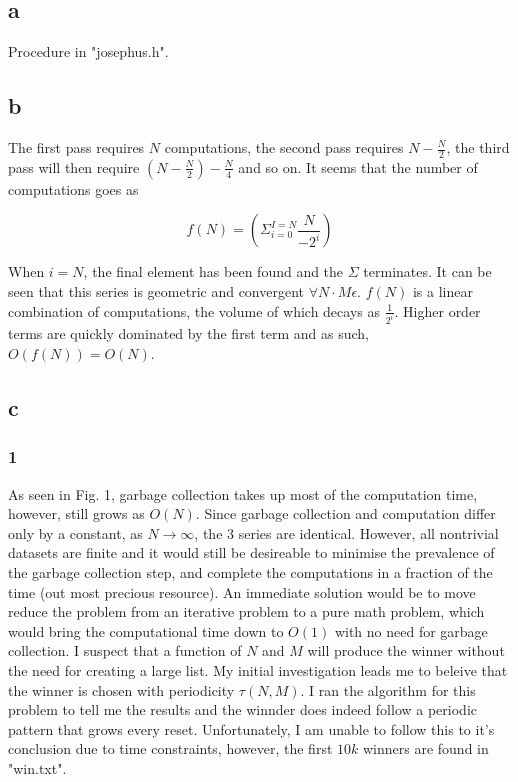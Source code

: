 \documentclass[journal]{IEEEtran}
\begin{document}
\subsection*{a}
Procedure in "josephus.h".

\subsection*{b}

The first pass requires $N$ computations, the second pass requires $N - \frac{N}{2}$, the third pass will then require
$(N - \frac{N}{2}) - \frac{N}{4}$ and so on. It seems that the number of computations goes as 

$$f(N) = (\Sigma_{i=0}^{I = N} \frac{N}{-2^i})$$

When $i = N$, the final element has been found and the $\Sigma$ terminates. It can be seen that this series is geometric 
and convergent $\forall N \cdot M \epsilon $. $f(N)$ is a linear combination of computations, the volume of which decays as 
$\frac{1}{2^i}$. Higher order terms are quickly dominated by the first term and as such, 
$O(f(N)) = \boxed{O(N)}$. 


\subsection*{c}

\subsubsection{1}

As seen in Fig. 1, garbage collection takes up most of the computation time, however, still grows as $O(N)$. Since 
garbage collection and computation differ only by a constant, as $N \rightarrow \infty$, the 3 series are identical.
However, all nontrivial datasets are finite and it would still be desireable to minimise the prevalence of the garbage 
collection step, and complete the computations in a fraction of the time (out most precious resource). An immediate 
solution would be to move reduce the problem from an iterative problem to a pure math problem, which would bring the 
computational time down to $O(1)$ with no need for garbage collection. I suspect that a function of $N$ and 
$M$ will produce the winner without the need for creating a large list. My initial investigation leads me to beleive that the winner is chosen with 
periodicity $\tau(N,M)$. I ran the algorithm for this problem to tell me the results and the winnder does indeed follow
a periodic pattern that grows every reset. Unfortunately, I am unable to follow this to it's conclusion due to time constraints, 
however, the first $10k$ winners are found in "win.txt".
\end{document}
